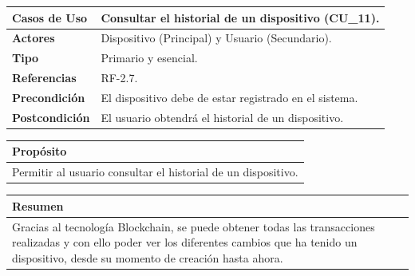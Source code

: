 \begin{itemize}
    \begin{table}[h!]
        \centering
        \begin{tabular}{|l|p{}|}
            \hline
            \textbf{Casos de Uso}   &   Consultar el historial de un dispositivo (CU\_11). \\
            \hline 
            \textbf{Actores}        &   Dispositivo (Principal) y Usuario (Secundario). \\ 
            \hline 
            \textbf{Tipo}           &   Primario y esencial. \\
            \hline
            \textbf{Referencias}    &   RF-2.7. \\ 
            \hline
            \textbf{Precondición}   &   El dispositivo debe de estar registrado en el sistema. \\ 
            \hline
            \textbf{Postcondición}  &   El usuario obtendrá el historial de un dispositivo. \\ 
            \hline
        \end{tabular}
        
        \vspace{5mm}
        
        \begin{tabular}{|p{\textwidth}|}
            \hline
            \rowcolor{SeaGreen} \textbf{Propósito} \\
            \hline
            \multicolumn{1}{|p{12cm}|}{Permitir al usuario consultar el historial de un dispositivo.} \\ [0.5ex]
            \hline
        \end{tabular}
        
        \vspace{5mm}
        
        \begin{tabular}{|p{\textwidth}|}
            \hline
            \rowcolor{SeaGreen} \textbf{Resumen} \\
            \hline
            \multicolumn{1}{|p{12cm}|}{Gracias al tecnología Blockchain, se puede obtener todas las transacciones
            realizadas y con ello poder ver los diferentes cambios que ha tenido un dispositivo, desde su momento
            de creación hasta ahora.} \\ [0.5ex]
            \hline
        \end{tabular}
        
        \vspace{5mm}
        

\end{table}
\end{itemize}
